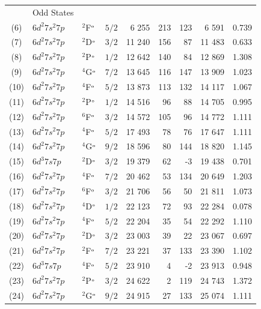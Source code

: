 \documentclass[10pt,a4paper, twoside]{report}
\begin{document}
\begin{table}[p!]
\begin{adjustwidth}{-1.3cm}{-1.3cm}
\begin{tabular}{cllcrrrrr}
&  Odd States \\
(6) & $6d^2 7s^2 7p$  &  $^2$F$^{\rm_o}$  & $5/2$ &  6 255 & 213 &  123 & 6 591 & 0.739 \\ 
(7)  & $6d^2 7s^2 7p$  &  $^2$D$^{\rm_o}$  & $3/2$ &  11 240 & 156 &  87 & 11 483 &  0.633 \\ 
(8)  &   $6d^2 7s^2 7p$  &  $^2$P$^{\rm_o}$ &  $1/2$ &  12 642 & 140 &  84  & 12 869 & 1.308 \\ 
(9)  &  $6d^2 7s^2 7p$  &  $^4$G$^{\rm_o}$ &  $7/2$  &  13 645 &  116 &  147 & 13 909 & 1.023 \\ 
(10)   &  $6d^2 7s^2 7p$  &  $^4$F$^{\rm_o}$  & $5/2$ &  13 873 & 113  &  132 & 14 117 & 1.067 \\ 
(11)   &  $6d^2 7s^2 7p$  &  $^2$P$^{\rm_o}$  & $1/2$ &  14 516 & 96  &  88  & 14 705 & 0.995 \\ 
(12)   &  $6d^2 7s^2 7p$  &  $^6$F$^{\rm_o}$  & $3/2$ &  14 572 & 105 & 96  & 14 772 & 1.111 \\ 
(13)   &  $6d^2 7s^2 7p$  &  $^4$F$^{\rm_o}$ &  $5/2$ &  17 493 & 78 &76  & 17 647 & 1.111 \\ 
(14)  &  $6d^2 7s^2 7p$  &  $^4$G$^{\rm_o}$  & $9/2$ &  18 596 & 80 &  144  & 18 820  & 1.145 \\ 
(15)  & $6d^3 7s 7p$  &  $^2$D$^{\rm_o}$  & $3/2$ &  19 379 & 62 &  -3  & 19 438 & 0.701 \\ 
 (16)  &  $6d^2 7s^2 7p$  &  $^4$F$^{\rm_o}$ &  $7/2$  &  20 462 & 53 & 134 & 20 649  & 1.203 \\ 
(17)  &  $6d^2 7s^2 7p$  &  $^6$F$^{\rm_o}$  & $3/2$ &  21 706 & 56  & 50 & 21 811 & 1.073 \\ 
(18)  &  $6d^2 7s^2 7p$  &  $^4$D$^{\rm_o}$ &  $1/2$ &  22 123 & 72  & 93 & 22 284 & 0.078 \\ 
(19)   &  $6d^2 7s^2 7p$  &  $^4$F$^{\rm_o}$ &  $5/2$ &  22 204 & 35  & 54 & 22 292 & 1.110 \\ 
(20)  &  $6d^2 7s^2 7p$  &  $^2$D$^{\rm_o}$  & $3/2$ &  23 003 & 39 & 22 & 23 067 & 0.697 \\ 
(21)  &  $6d^2 7s^2 7p$  &  $^2$F$^{\rm_o}$ &  $7/2$  &  23 221 & 37   & 133 & 23 390 & 1.102 \\ 
(22)  &  $6d^3 7s 7p$  &  $^4$F$^{\rm_o}$  & $5/2$ &  23 910 &  4 &  -2 & 23 913 & 0.948 \\ 
(23) &   $6d^2 7s^2 7p$  &  $^2$P$^{\rm_o}$ &  $3/2$ &  24 622 & 2  &  119  & 24 743  & 1.372 \\ 
(24)  &   $6d^2 7s^2 7p$  &  $^2$G$^{\rm_o}$  & $9/2$ &  24 915&  27  & 133 & 25 074 & 1.111 \\ 

\end{tabular}
\end{adjustwidth}
\end{table}
\end{document}
